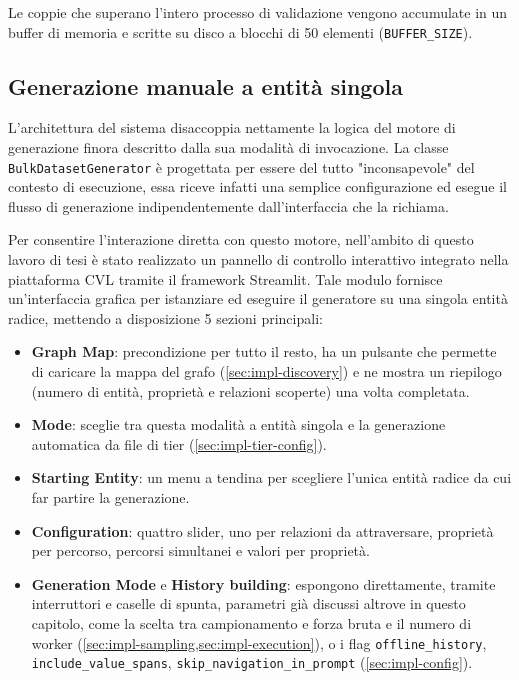 \documentclass[12pt,a4paper,openright,twoside]{book}
\begin{document}
Le coppie che superano l'intero processo di validazione vengono accumulate in un
buffer di memoria e scritte su disco a blocchi di 50 elementi
(\texttt{BUFFER\_SIZE}).

\subsection{Generazione manuale a entità singola}
\label{sec:impl-manual}

L'architettura del sistema disaccoppia nettamente la logica del motore di
generazione finora descritto dalla sua modalità di invocazione. La classe
\texttt{BulkDatasetGenerator} è progettata per essere del tutto "inconsapevole"
del contesto di esecuzione, essa riceve infatti una semplice configurazione ed
esegue il flusso di generazione indipendentemente dall'interfaccia che la
richiama.

Per consentire l'interazione diretta con questo motore, nell'ambito di questo
lavoro di tesi è stato realizzato un pannello di controllo interattivo integrato
nella piattaforma CVL tramite il framework Streamlit. Tale modulo fornisce
un'interfaccia grafica per istanziare ed eseguire il generatore su una singola
entità radice, mettendo a disposizione 5 sezioni principali:

\begin{itemize}
    \item \textbf{Graph Map}: precondizione per tutto il resto, ha un pulsante
          che permette di caricare la mappa del grafo
          (\cref{sec:impl-discovery}) e ne mostra un riepilogo (numero di
          entità, proprietà e relazioni scoperte) una volta completata.
    \item \textbf{Mode}: sceglie tra questa modalità a entità singola e la
          generazione automatica da file di tier (\cref{sec:impl-tier-config}).
    \item \textbf{Starting Entity}: un menu a tendina per scegliere l'unica
          entità radice da cui far partire la generazione.
    \item \textbf{Configuration}: quattro slider, uno per relazioni da
          attraversare, proprietà per percorso, percorsi simultanei e valori per
          proprietà.
    \item \textbf{Generation Mode} e \textbf{History building}: espongono
          direttamente, tramite interruttori e caselle di spunta, parametri già
          discussi altrove in questo capitolo, come la scelta tra campionamento
          e forza bruta e il numero di worker
          (\cref{sec:impl-sampling,sec:impl-execution}), o i flag
          \texttt{offline\_history}, \texttt{include\_value\_spans},
          \texttt{skip\_navigation\_in\_prompt} (\cref{sec:impl-config}).
\end{itemize}
\end{document}
